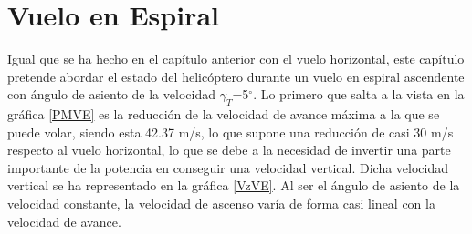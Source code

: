 \thispagestyle{empty}
\chapter{Vuelo en Espiral}


Igual que se ha hecho en el capítulo anterior con el vuelo horizontal, este capítulo pretende abordar el estado del helicóptero durante un vuelo en espiral ascendente con ángulo de asiento de la velocidad $\gamma_T$=5$^\circ$.
Lo primero que salta a la vista en la gráfica \ref{PMVE} es la reducción de la velocidad de avance máxima a la que se puede volar, siendo esta 42.37 m/s, lo que supone una reducción de casi 30 m/s respecto al vuelo horizontal, lo que se debe a la necesidad de invertir una parte importante de la potencia en conseguir una velocidad vertical. Dicha velocidad vertical se ha representado en la gráfica \ref{VzVE}. Al ser el ángulo de asiento de la velocidad constante, la velocidad de ascenso varía de forma casi lineal con la velocidad de avance.


